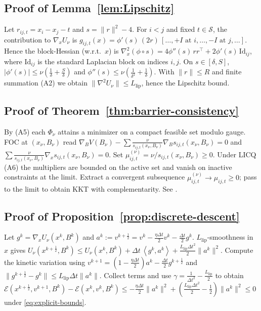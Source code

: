 \documentclass[11pt]{article}
\theoremstyle{remark}
\theoremstyle{definition}
\newcommand{\Id}{\mathrm{Id}}
\newcommand{\inner}[2]{\left\langle #1, #2 \right\rangle}
\newcommand{\Llip}{L_{\text{lip}}}
\newcommand{\ShiftSet}{\mathcal{S}}            %
\begin{document}
\subsection{Proof of Lemma~\ref{lem:Lipschitz}}\label{app:proof-lip}
Let $r_{ij,t}=x_i-x_j-t$ and $s=\|r\|^2-4$. For $i<j$ and fixed $t\in\ShiftSet$, the contribution to $\nabla_x U_\nu$ is
$g_{ij,t}(x)=\phi'(s)\,(2r)\,[\dots,+I \text{ at } i,\dots,-I \text{ at } j,\dots]$.
Hence the block-Hessian (w.r.t.\ $x$) is
$\nabla^2_{x} (\phi\circ s) = 4\phi''(s)\,rr^\top + 2\phi'(s)\,\Id_{ij}$,
where $\Id_{ij}$ is the standard Laplacian block on indices $i,j$. On $s\in[\delta,S]$,
$|\phi'(s)|\le \nu(\tfrac{1}{\delta}+\tfrac{S}{\delta})$ and $\phi''(s)\le \nu(\tfrac{1}{\delta^2}+\tfrac{1}{\delta})$.
With $\|r\|\le R$ and finite summation (A2) we obtain $\|\nabla^2 U_\nu\|\le \Llip$, hence the Lipschitz bound.

\subsection{Proof of Theorem~\ref{thm:barrier-consistency}}\label{app:proof-barrier-kkt}
By (A5) each $\Phi_\nu$ attains a minimizer on a compact feasible set modulo gauge. FOC at $(x_\nu,B_\nu)$ read
$\nabla_B V(B_\nu) - \sum \frac{\nu}{s_{ij,t}(x_\nu,B_\nu)} \nabla_B s_{ij,t}(x_\nu,B_\nu)=0$
and
$\sum \frac{\nu}{s_{ij,t}(x_\nu,B_\nu)} \nabla_x s_{ij,t}(x_\nu,B_\nu)=0$.
Set $\mu_{ij,t}^{(\nu)}=\nu/s_{ij,t}(x_\nu,B_\nu)\ge 0$. Under LICQ (A6) the multipliers are bounded on the active set and vanish on inactive constraints at the limit. Extract a convergent subsequence $\mu_{ij,t}^{(\nu)}\to\mu_{ij,t}\ge 0$; pass to the limit to obtain KKT with complementarity. See \cite{ForsgrenGillWright02}.

\subsection{Proof of Proposition~\ref{prop:discrete-descent}}
Let $g^k=\nabla_x U_\nu(x^k,B^k)$ and $a^k:=v^{k+\frac12}=v^k-\tfrac{\eta\Delta t}{2}v^k-\tfrac{\Delta t}{2}g^k$. $\Llip$-smoothness in $x$ gives
$U_\nu(x^{k+\frac12},B^k)\le U_\nu(x^k,B^k)+\Delta t\,\inner{g^k}{a^k}+\tfrac{\Llip\Delta t^2}{2}\|a^k\|^2$.
Compute the kinetic variation using $v^{k+1}=(1-\tfrac{\eta\Delta t}{2})a^k - \tfrac{\Delta t}{2}g^{k+\frac12}$ and $\|g^{k+\frac12}-g^k\|\le \Llip\Delta t\|a^k\|$.
Collect terms and use $\gamma=\tfrac{1}{\Delta t^2}-\tfrac{\Llip}{2}$ to obtain
$\mathcal{E}(x^{k+\frac12},v^{k+1},B^k)-\mathcal{E}(x^k,v^k,B^k) \le -\tfrac{\eta\Delta t}{2}\|a^k\|^2 + (\tfrac{\Llip\Delta t^2}{2}-\tfrac12)\|a^k\|^2\le 0$
under \eqref{eq:explicit-bounds}.
\end{document}
